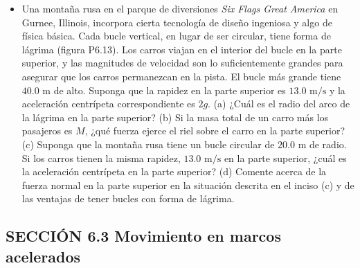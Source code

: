 \documentclass[11pt,a4paper]{article}
\begin{document}
\begin{itemize}
    \item[\textbf{13.}] Una montaña rusa en el parque de diversiones \textit{Six Flags Great America} en Gurnee, Illinois, incorpora cierta tecnología de diseño ingeniosa y algo de física básica. Cada bucle vertical, en lugar de ser circular, tiene forma de lágrima (figura P6.13). Los carros viajan en el interior del bucle en la parte superior, y las magnitudes de velocidad son lo suficientemente grandes para asegurar que los carros permanezcan en la pista. El bucle más grande tiene $40.0 \text{ m}$ de alto. Suponga que la rapidez en la parte superior es $13.0 \text{ m/s}$ y la aceleración centrípeta correspondiente es $2g$. (a) ¿Cuál es el radio del arco de la lágrima en la parte superior? (b) Si la masa total de un carro más los pasajeros es $M$, ¿qué fuerza ejerce el riel sobre el carro en la parte superior? (c) Suponga que la montaña rusa tiene un bucle circular de $20.0 \text{ m}$ de radio. Si los carros tienen la misma rapidez, $13.0 \text{ m/s}$ en la parte superior, ¿cuál es la aceleración centrípeta en la parte superior? (d) Comente acerca de la fuerza normal en la parte superior en la situación descrita en el inciso (c) y de las ventajas de tener bucles con forma de lágrima.
    \vspace*{8cm}
\end{itemize}

\subsection*{SECCIÓN 6.3 Movimiento en marcos acelerados}
\end{document}
